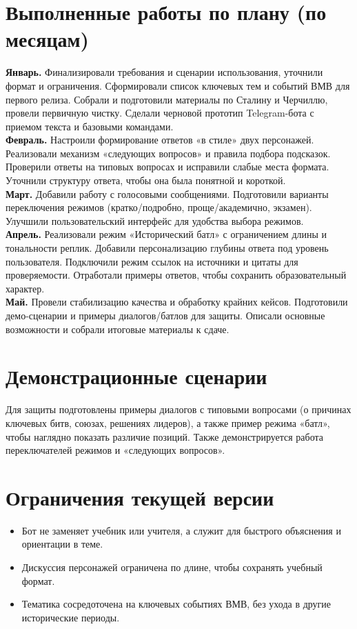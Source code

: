 \documentclass[a4paper,14pt]{extarticle}
\begin{document}
    \section{Выполненные работы по плану (по месяцам)}
    \textbf{Январь.} Финализировали требования и сценарии использования, уточнили формат и ограничения. Сформировали список ключевых тем и событий ВМВ для первого релиза. Собрали и подготовили материалы по Сталину и Черчиллю, провели первичную чистку. Сделали черновой прототип Telegram-бота с приемом текста и базовыми командами.\\
    \textbf{Февраль.} Настроили формирование ответов «в стиле» двух персонажей. Реализовали механизм «следующих вопросов» и правила подбора подсказок. Проверили ответы на типовых вопросах и исправили слабые места формата. Уточнили структуру ответа, чтобы она была понятной и короткой.\\
    \textbf{Март.} Добавили работу с голосовыми сообщениями. Подготовили варианты переключения режимов (кратко/подробно, проще/академично, экзамен). Улучшили пользовательский интерфейс для удобства выбора режимов.\\
    \textbf{Апрель.} Реализовали режим «Исторический батл» с ограничением длины и тональности реплик. Добавили персонализацию глубины ответа под уровень пользователя. Подключили режим ссылок на источники и цитаты для проверяемости. Отработали примеры ответов, чтобы сохранить образовательный характер.\\
    \textbf{Май.} Провели стабилизацию качества и обработку крайних кейсов. Подготовили демо-сценарии и примеры диалогов/батлов для защиты. Описали основные возможности и собрали итоговые материалы к сдаче.

    \section{Демонстрационные сценарии}
    Для защиты подготовлены примеры диалогов с типовыми вопросами (о причинах ключевых битв, союзах, решениях лидеров), а также пример режима «батл», чтобы наглядно показать различие позиций. Также демонстрируется работа переключателей режимов и «следующих вопросов».

    \section{Ограничения текущей версии}
    \begin{itemize}
        \item Бот не заменяет учебник или учителя, а служит для быстрого объяснения и ориентации в теме.
        \item Дискуссия персонажей ограничена по длине, чтобы сохранять учебный формат.
        \item Тематика сосредоточена на ключевых событиях ВМВ, без ухода в другие исторические периоды.
    \end{itemize}
\end{document}
